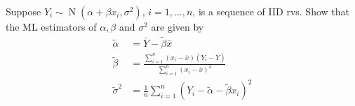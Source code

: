 \documentclass[notoc,notitlepage]{tufte-book}
\DeclareMathOperator{\Nor}{N }
\begin{document}
\begin{eg}
  Suppose $Y_i \sim \Nor\left( \alpha + \beta x_i, \sigma^2 \right)$, $i= 1, ..., n$, is a sequence of IID rvs. Show that the ML estimators of $\alpha, \beta$ and $\sigma^2$ are given by
  \begin{align*}
    \tilde{\alpha} &= \bar{Y} - \tilde{\beta} \bar{x} \\
    \tilde{\beta} &= \frac{\sum\limits_{i=1}^{n} (x_i - \bar{x})(Y_i - \bar{Y})}{\sum\limits_{i=1}^{n} (x_i - \bar{x})^2} \\
    \tilde{\sigma}^2 &= \frac{1}{n} \sum_{i=1}^{n} \left(Y_i - \tilde{\alpha} - \tilde{\beta}x_i\right)^2
  \end{align*}
\end{eg}
\end{document}
